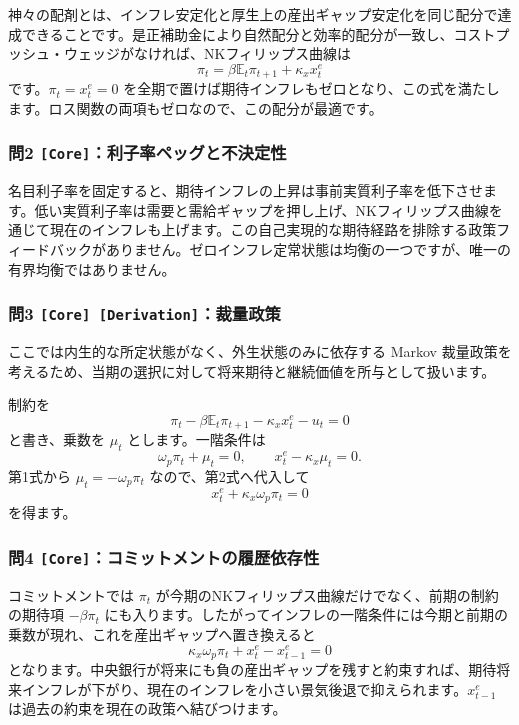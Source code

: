 \documentclass[
  japanese,
  lualatex,
  ja=standard,
  11pt,
  a4paper]{ltjsarticle}
\begin{document}
神々の配剤とは、インフレ安定化と厚生上の産出ギャップ安定化を同じ配分で達成できることです。是正補助金により自然配分と効率的配分が一致し、コストプッシュ・ウェッジがなければ、NKフィリップス曲線は
\[
\pi_t=\beta\mathbb E_t\pi_{t+1}+\kappa_xx_t^e
\] です。\(\pi_t=x_t^e=0\)
を全期で置けば期待インフレもゼロとなり、この式を満たします。ロス関数の両項もゼロなので、この配分が最適です。

\subsubsection{\texorpdfstring{問2
\texttt{{[}Core{]}}：利子率ペッグと不決定性}{問2 {[}Core{]}：利子率ペッグと不決定性}}\label{ux554f2-coreux5229ux5b50ux7387ux30daux30c3ux30b0ux3068ux4e0dux6c7aux5b9aux6027}

名目利子率を固定すると、期待インフレの上昇は事前実質利子率を低下させます。低い実質利子率は需要と需給ギャップを押し上げ、NKフィリップス曲線を通じて現在のインフレも上げます。この自己実現的な期待経路を排除する政策フィードバックがありません。ゼロインフレ定常状態は均衡の一つですが、唯一の有界均衡ではありません。

\subsubsection{\texorpdfstring{問3
\texttt{{[}Core{]}\ {[}Derivation{]}}：裁量政策}{問3 {[}Core{]} {[}Derivation{]}：裁量政策}}\label{ux554f3-core-derivationux88c1ux91cfux653fux7b56}

ここでは内生的な所定状態がなく、外生状態のみに依存する Markov
裁量政策を考えるため、当期の選択に対して将来期待と継続価値を所与として扱います。

制約を \[
\pi_t-\beta\mathbb E_t\pi_{t+1}-\kappa_xx_t^e-u_t=0
\] と書き、乗数を \(\mu_t\) とします。一階条件は \[
\omega_p\pi_t+\mu_t=0,
\qquad
x_t^e-\kappa_x\mu_t=0.
\] 第1式から \(\mu_t=-\omega_p\pi_t\) なので、第2式へ代入して \[
x_t^e+\kappa_x\omega_p\pi_t=0
\] を得ます。

\subsubsection{\texorpdfstring{問4
\texttt{{[}Core{]}}：コミットメントの履歴依存性}{問4 {[}Core{]}：コミットメントの履歴依存性}}\label{ux554f4-coreux30b3ux30dfux30c3ux30c8ux30e1ux30f3ux30c8ux306eux5c65ux6b74ux4f9dux5b58ux6027}

コミットメントでは \(\pi_t\)
が今期のNKフィリップス曲線だけでなく、前期の制約の期待項 \(-\beta\pi_t\)
にも入ります。したがってインフレの一階条件には今期と前期の乗数が現れ、これを産出ギャップへ置き換えると
\[
\kappa_x\omega_p\pi_t+x_t^e-x_{t-1}^e=0
\]
となります。中央銀行が将来にも負の産出ギャップを残すと約束すれば、期待将来インフレが下がり、現在のインフレを小さい景気後退で抑えられます。\(x_{t-1}^e\)
は過去の約束を現在の政策へ結びつけます。
\end{document}
